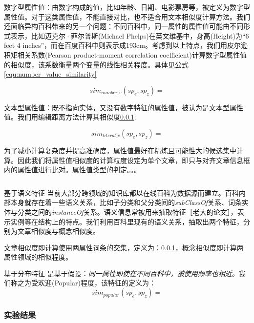 数字型属性值：由数字构成的值，比如年龄、日期、电影票房等，被定义为数字型属性值。对于这类属性值，不能直接对比，也不适合用文本相似度计算方法。我们还面临异构百科带来的另一个问题：不同百科中，同一属性的属性值可能由不同形式表示，比如迈克尔·菲尔普斯(Michael Phelps)在英文维基中，身高(Height)为“6 feet 4 inches”，而在百度百科中则表示成193cm。考虑到以上特点，我们用皮尔逊积矩相关系数(Pearson product-moment correlation coefficient)计算数字型属性值的相似度，该系数衡量两个变量的线性相关程度。具体见公式\ref{equ:number_value_similarity}

\begin{equation}
\label{equ:number_value_similarity}
sim_{number\_v}(sp_e, sp_z) = 
\end{equation}

文本型属性值：既不指向实体，又没有数字特征的属性值，被认为是文本型属性值。我们用编辑距离方法计算其相似度\ref{}:

\begin{equation}
\label{equ:literal_value_similarity}
sim_{literal\_v}(sp_e, sp_z) =
\end{equation}

为了减小计算复杂度并提高准确度，属性值最好在精炼且可能性大的候选集中计算。因此我们将属性值相似度的计算粒度设定为单个文章，即只与对齐文章信息框内的属性值进行比对。属性值类型的判定。。。

\begin{equation}
\end{equation}

{\heiti 基于语义特征}
当前大部分跨领域的知识库都以在线百科为数据源而建立。百科内部本身就存在着一些语义关系，比如子分类和父分类间的\textit{subClassOf}关系、词条实体与分类之间的\textit{instanceOf}关系。语义信息常被用来抽取特征［老大的论文］，表示实例等在结构上的特点。我们利用百科里现有的语义关系，抽取出两个特征，分别为文章相似度与概念相似度。 

文章相似度即计算使用两属性词条的交集，定义为：\ref{}，概念相似度即计算两属性领域的相似程度。

{\heiti 基于分布特征}
是基于假设：\textit{同一属性即使在不同百科中，被使用频率也相近。}我们称之为受欢迎(Popular)程度，该特征的定义为：
\begin{equation}
sim_{popular}(sp_e, sp_z) = 
\end{equation}

\subsubsection{实验结果}

